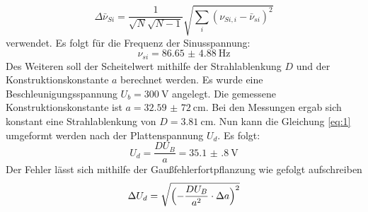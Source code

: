 \begin{equation}
  \Delta \bar{\nu}_{Si} = \frac{1}{\sqrt{N}\sqrt{N-1}} \sqrt{\sum_{i}(\nu_{Si,i}-\bar{\nu}_{si})^2}
  \label{fel:2}
\end{equation}
verwendet.
Es folgt für die Frequenz der Sinusspannung:
\begin{equation*}
  \nu_{si}= \SI{86.65(488)}{\hertz}
\end{equation*}
Des Weiteren soll der Scheitelwert mithilfe der Strahlablenkung $D$ und der Konstruktionskonstante $a$ berechnet werden.
Es wurde eine Beschleunigungsspannung $U_b = \SI{300}{\volt}$ angelegt. Die gemessene Konstruktionskonstante ist
$a = \SI{32,59(72)}{\centi\meter}$.
Bei den Messungen ergab sich konstant eine Strahlablenkung von $D = \SI{3.81}{\centi\meter}$.
Nun kann die Gleichung \ref{eq:1} umgeformt werden nach  der Plattenspannung $U_d$.
Es folgt:
\begin{equation*}
  U_d = \frac{D U_B}{a} = \SI{35.1(8)}{\volt}
\end{equation*}
Der Fehler lässt sich mithilfe der Gaußfehlerfortpflanzung wie gefolgt aufschreiben
\begin{equation}
  \Delta U_d = \sqrt{\Bigl(-\frac{DU_B}{a^2}\cdot \Delta a\Bigr)^2}
\end{equation}
